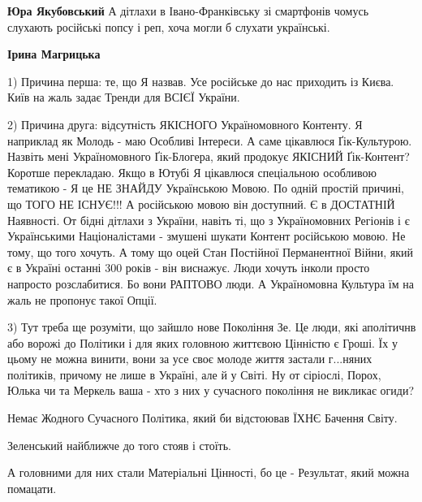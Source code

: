 \begin{itemize}
\begin{itemize}
 
\textbf{Юра Якубовський} А дітлахи в Івано-Франківську зі смартфонів чомусь слухають російські попсу і реп, хоча могли б слухати українські.

 
\textbf{Ірина Магрицька}

1) Причина перша: те, що Я назвав. Усе російське до нас приходить із Києва.
Київ на жаль задає Тренди для ВСІЄЇ України.

2) Причина друга: відсутність ЯКІСНОГО Україномовного Контенту. Я наприклад як
Молодь - маю Особливі Інтереси. А саме цікавлюся Ґік-Культурою. Назвіть мені
Україномовного Ґік-Блогера, який продокує ЯКІСНИЙ Ґік-Контент? Коротше
перекладаю. Якщо в Ютубі Я цікавлюся спеціальною особливою тематикою - Я це НЕ
ЗНАЙДУ Українською Мовою. По одній простій причині, що ТОГО НЕ ІСНУЄ!!! А
російською мовою він доступний. Є в ДОСТАТНІЙ Наявності. От бідні дітлахи з
України, навіть ті, що з Україномовних Регіонів і є Українськими Націоналістами
- змушені шукати Контент російською мовою. Не тому, що того хочуть. А тому що
оцей Стан Постійної Перманентної Війни, який є в Україні останні 300 років -
він виснажує. Люди хочуть інколи просто напросто розслабитися. Бо вони РАПТОВО
люди. А Україномовна Культура їм на жаль не пропонує такої Опції.

3) Тут треба ще розуміти, що зайшло нове Покоління Зе. Це люди, які аполітичнв
або ворожі до Політики і для яких головною життєвою Цінністю є Гроші. Їх у
цьому не можна винити, вони за усе своє молоде життя застали г...няних
політиків, причому не лише в Україні, але й у Світі. Ну от сіріослі, Порох,
Юлька чи та Меркель ваша - хто з них у сучасного покоління не викликає огиди?

Немає Жодного Сучасного Політика, який би відстоював ЇХНЄ Бачення Світу.

Зеленський найближче до того стояв і стоїть. 

А головними для них стали Матеріальні Цінності, бо це - Результат, який можна
помацати. 


\end{itemize}
\end{itemize}
